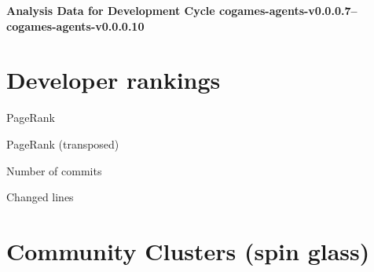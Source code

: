\documentclass{article}
\begin{document}
\setlength{\parindent}{0pt}
\begin{center}
\begin{Large}
\textbf{Analysis Data for Development Cycle cogames-agents-v0.0.0.7--cogames-agents-v0.0.0.10}
\end{Large}
\end{center}
\section{Developer rankings}
\begin{small}\renewcommand{\tabcolsep}{1pt}
\begin{minipage}{0.5\linewidth}
PageRank\\

\end{minipage}%
\begin{minipage}{0.5\linewidth}
PageRank (transposed)\\

\end{minipage}

\renewcommand{\tabcolsep}{5pt}
\begin{minipage}{0.5\linewidth}
Number of commits\\

\end{minipage}%
\begin{minipage}{0.5\linewidth}
Changed lines\\

\end{minipage}
\end{small}
\newpage\section{Community Clusters (spin glass)}
\end{document}
